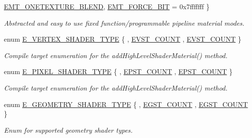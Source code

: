 \begin{DoxyCompactItemize}
\hyperlink{namespaceirr_1_1video_ac8e9b6c66f7cebabd1a6d30cbc5430f1a44b2edd34551db04d3883772d3874f78}{E\+M\+T\+\_\+\+O\+N\+E\+T\+E\+X\+T\+U\+R\+E\+\_\+\+B\+L\+E\+ND}, 
\hyperlink{namespaceirr_1_1video_ac8e9b6c66f7cebabd1a6d30cbc5430f1a0c20156ccd4b16d2e0c868e7c32567d8}{E\+M\+T\+\_\+\+F\+O\+R\+C\+E\+\_\+B\+IT} = 0x7fffffff
 \}\begin{DoxyCompactList}\small\item\em Abstracted and easy to use fixed function/programmable pipeline material modes. \end{DoxyCompactList}
\item 
enum \hyperlink{namespaceirr_1_1video_a9decae50d4dc2455e7b009f5c71b24f9}{E\+\_\+\+V\+E\+R\+T\+E\+X\+\_\+\+S\+H\+A\+D\+E\+R\+\_\+\+T\+Y\+PE} \{ , \hyperlink{namespaceirr_1_1video_a9decae50d4dc2455e7b009f5c71b24f9a21617defc2d16ecc136809cdc15c4039}{E\+V\+S\+T\+\_\+\+C\+O\+U\+NT}
, \hyperlink{namespaceirr_1_1video_a9decae50d4dc2455e7b009f5c71b24f9a21617defc2d16ecc136809cdc15c4039}{E\+V\+S\+T\+\_\+\+C\+O\+U\+NT}
 \}\begin{DoxyCompactList}\small\item\em Compile target enumeration for the add\+High\+Level\+Shader\+Material() method. \end{DoxyCompactList}
\item 
enum \hyperlink{namespaceirr_1_1video_a07fb77e9aec681402ad376f7ef9b724c}{E\+\_\+\+P\+I\+X\+E\+L\+\_\+\+S\+H\+A\+D\+E\+R\+\_\+\+T\+Y\+PE} \{ , \hyperlink{namespaceirr_1_1video_a07fb77e9aec681402ad376f7ef9b724cae6fecb0d5236814bd0ee7e70800f500f}{E\+P\+S\+T\+\_\+\+C\+O\+U\+NT}
, \hyperlink{namespaceirr_1_1video_a07fb77e9aec681402ad376f7ef9b724cae6fecb0d5236814bd0ee7e70800f500f}{E\+P\+S\+T\+\_\+\+C\+O\+U\+NT}
 \}\begin{DoxyCompactList}\small\item\em Compile target enumeration for the add\+High\+Level\+Shader\+Material() method. \end{DoxyCompactList}
\item 
enum \hyperlink{namespaceirr_1_1video_a3aad41cbdf894faaeeadf465592af18f}{E\+\_\+\+G\+E\+O\+M\+E\+T\+R\+Y\+\_\+\+S\+H\+A\+D\+E\+R\+\_\+\+T\+Y\+PE} \{ , \hyperlink{namespaceirr_1_1video_a3aad41cbdf894faaeeadf465592af18fa12b7af3b4df6db3a325710c1e5ab5273}{E\+G\+S\+T\+\_\+\+C\+O\+U\+NT}
, \hyperlink{namespaceirr_1_1video_a3aad41cbdf894faaeeadf465592af18fa12b7af3b4df6db3a325710c1e5ab5273}{E\+G\+S\+T\+\_\+\+C\+O\+U\+NT}
 \}\begin{DoxyCompactList}\small\item\em Enum for supported geometry shader types. \end{DoxyCompactList}

\end{DoxyCompactItemize}
